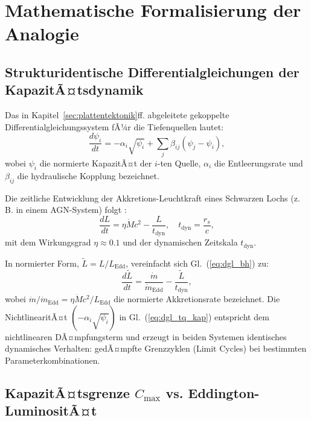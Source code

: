 ﻿\documentclass[12pt,a4paper]{report}
\begin{document}
\section{Mathematische Formalisierung der Analogie}

\subsection{Strukturidentische Differentialgleichungen der Kapazi\-tÃ¤tsdynamik}

Das in Kapitel~\ref{sec:plattentektonik}ff. abgeleitete gekoppelte Differentialgleichungssystem fÃ¼r die Tiefenquellen lautet:
\begin{equation}
	\frac{d\psi_i}{dt} = -\alpha_i\sqrt{\psi_i} + \sum_j \beta_{ij}(\psi_j - \psi_i),
	\label{eq:dgl_tq_kap}
\end{equation}
wobei $\psi_i$ die normierte KapazitÃ¤t der $i$-ten Quelle, $\alpha_i$ die Entleerungsrate und $\beta_{ij}$ die hydraulische Kopplung bezeichnet.

Die zeitliche Entwicklung der Akkretions-Leuchtkraft eines Schwarzen Lochs (z.\,B. in einem AGN-System) folgt \cite{shakura1973,kormendy2013}:
\begin{equation}
	\frac{dL}{dt} = \eta \dot{M} c^2 - \frac{L}{t_{\mathrm{dyn}}}, \quad t_{\mathrm{dyn}} = \frac{r_s}{c},
	\label{eq:dgl_bh}
\end{equation}
mit dem Wirkungsgrad $\eta \approx 0.1$ und der dynamischen Zeitskala $t_{\mathrm{dyn}}$.

In normierter Form, $\tilde{L} = L/L_{\mathrm{Edd}}$, vereinfacht sich Gl.~(\ref{eq:dgl_bh}) zu:
\begin{equation}
	\frac{d\tilde{L}}{dt} = \frac{\dot{m}}{\dot{m}_{\mathrm{Edd}}} - \frac{\tilde{L}}{t_{\mathrm{dyn}}},
	\label{eq:dgl_bh_norm}
\end{equation}
wobei $\dot{m}/\dot{m}_{\mathrm{Edd}} = \eta\dot{M}c^2/L_{\mathrm{Edd}}$ die normierte Akkretionsrate bezeichnet. Die NichtlinearitÃ¤t $(-\alpha_i\sqrt{\psi_i})$ in Gl.~(\ref{eq:dgl_tq_kap}) entspricht dem nichtlinearen DÃ¤mpfungsterm und erzeugt in beiden Systemen identisches dynamisches Verhalten: gedÃ¤mpfte Grenzzyklen (Limit Cycles) bei bestimmten Parameterkombinationen.

\subsection{KapazitÃ¤tsgrenze $C_{\max}$ vs. Eddington-LuminositÃ¤t}
\end{document}
